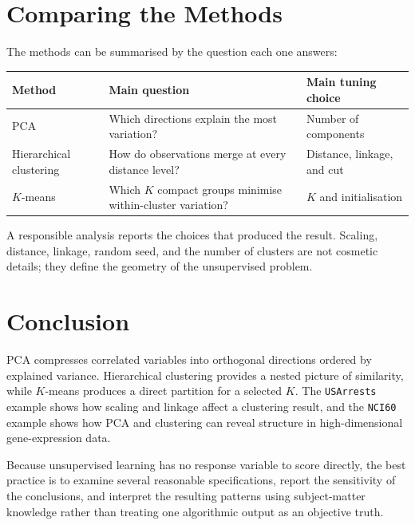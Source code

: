 \documentclass[
  11pt,
]{article}
\newcounter{none} %
\begin{document}
\section{Comparing the Methods}\label{comparing-the-methods}

The methods can be summarised by the question each one answers:

{\def\LTcaptype{none} %
\begin{longtable}[]{@{}
  >{\raggedright\arraybackslash}p{}
  >{\raggedright\arraybackslash}p{}
  >{\raggedright\arraybackslash}p{}@{}}
\toprule\noalign{}
\begin{minipage}[b]{\linewidth}\raggedright
Method
\end{minipage} & \begin{minipage}[b]{\linewidth}\raggedright
Main question
\end{minipage} & \begin{minipage}[b]{\linewidth}\raggedright
Main tuning choice
\end{minipage} \\
\midrule\noalign{}
\endhead
\bottomrule\noalign{}
\endlastfoot
PCA & Which directions explain the most variation? & Number of
components \\
Hierarchical clustering & How do observations merge at every distance
level? & Distance, linkage, and cut \\
\(K\)-means & Which \(K\) compact groups minimise within-cluster
variation? & \(K\) and initialisation \\
\end{longtable}
}

A responsible analysis reports the choices that produced the result.
Scaling, distance, linkage, random seed, and the number of clusters are
not cosmetic details; they define the geometry of the unsupervised
problem.

\section{Conclusion}\label{conclusion}

PCA compresses correlated variables into orthogonal directions ordered
by explained variance. Hierarchical clustering provides a nested picture
of similarity, while \(K\)-means produces a direct partition for a
selected \(K\). The \texttt{USArrests} example shows how scaling and
linkage affect a clustering result, and the \texttt{NCI60} example shows
how PCA and clustering can reveal structure in high-dimensional
gene-expression data.

Because unsupervised learning has no response variable to score
directly, the best practice is to examine several reasonable
specifications, report the sensitivity of the conclusions, and interpret
the resulting patterns using subject-matter knowledge rather than
treating one algorithmic output as an objective truth.
\end{document}
